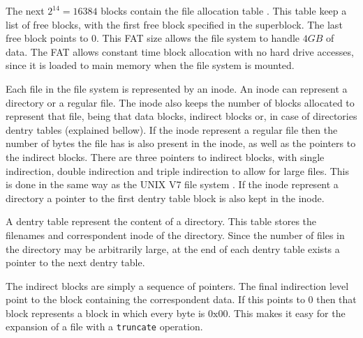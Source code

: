 \documentclass{acm_proc_article-sp}
\begin{document}
The next $2^{14}=16384$ blocks contain the file allocation table \cite{mos:fs}. 
This table keep a list of free blocks, with the first free block specified
in the superblock. The last free block points to 0. This FAT size
allows the file system to handle $4GB$ of data.
The FAT allows constant time block allocation with no hard drive accesses,
since it is loaded to main memory when the file system is mounted.

Each file in the file system is represented by an inode. An inode
can represent a directory or a regular file. The inode also keeps
the number of blocks allocated to represent that file, being that
data blocks, indirect blocks or, in case of directories dentry tables 
(explained bellow). If the inode represent a regular file then the number
of bytes the file has is also present in the inode, as well as the pointers
to the indirect blocks. There are three pointers to indirect blocks, with
single indirection, double indirection and triple indirection to allow
for large files. This is done in the same way as the UNIX V7 file system
\cite{mos:fs}.
If the inode represent a directory a pointer to the
first dentry table block is also kept in the inode.

A dentry table represent the content of a directory. This table stores
the filenames and correspondent inode of the directory. Since the number
of files in the directory may be arbitrarily large, at the end of each
dentry table exists a pointer to the next dentry table.

The indirect blocks are simply a sequence of pointers. The final indirection
level point to the block containing the correspondent data. If this points
to 0 then that block represents a block in which every byte is $0\text{x}00$.
This makes it easy for the expansion of a file with a \verb|truncate| operation.
\end{document}
